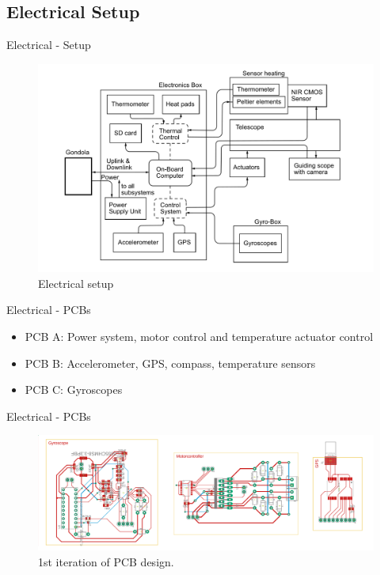 \documentclass[11pt, aspectratio=169]{beamer}
\begin{document}
\subsection{Electrical Setup}
    \begin{frame}[c]{Electrical - Setup}
   		\begin{figure}
            \includegraphics[width=.7\textwidth]{electrical/Setup.png}
           	\caption{Electrical setup}
        \end{figure}
    \end{frame}
    
	
	\begin{frame}[c]{Electrical - PCBs}
   	   \begin{itemize}
			\item PCB A: Power system, motor control and temperature actuator control
  			\item PCB B: Accelerometer, GPS, compass, temperature sensors
  			\item PCB C: Gyroscopes
       \end{itemize}
    \end{frame}
    
 	\begin{frame}[c]{Electrical - PCBs}
       \begin{figure}[H]
            \includegraphics[width=.7\textwidth]{electrical/PCB_1st.png}
           	\caption{1st iteration of PCB design.}
        \end{figure}  
    \end{frame}
\end{document}
